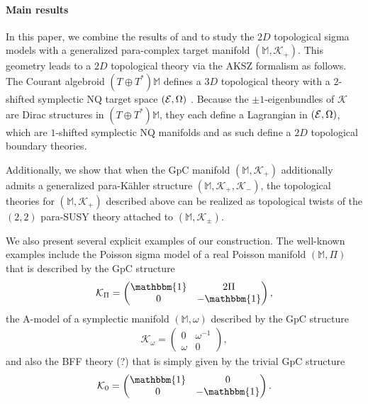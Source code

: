 \documentclass{article}
\newcommand{\TT}{{T\oplus T^*}}
\newcommand{\KK}{\mathcal{K}}
\newcommand{\id}{\mathbbm{1}}
\newcommand{\Mb}{\mathbb{M}}
\theoremstyle{definition}
\theoremstyle{remark}
\begin{document}
\paragraph{Main results} In this paper, we combine the results of \cite{HullTwistedSUSY} and \cite{Hu:2019zro} to study the $2D$ topological sigma models with a generalized para-complex target manifold $(\Mb,\KK_+)$. This geometry leads to a $2D$ topological theory via the AKSZ formalism as follows. The Courant algebroid $(\TT)\Mb$ defines a $3D$ topological theory with a $2$-shifted symplectic NQ target space $({\cal E},\Omega)$ \cite{Roytenberg:2002nu}. Because the $\pm 1$-eigenbundles of $\KK$ are Dirac structures in $(\TT)\Mb$, they each define a Lagrangian in $({\cal E},\Omega)$, which are $1$-shifted symplectic NQ manifolds and as such define a $2D$ topological boundary theories.

Additionally, we show that when the GpC manifold $(\Mb,\KK_+)$ additionally admits a generalized para-K\"ahler structure $(\Mb,\KK_+,\KK_-)$, the topological theories for $(\Mb,\KK_+)$ described above can be realized as topological twists of the $(2,2)$ para-SUSY theory attached to $(\Mb,\KK_\pm)$.

We also present several explicit examples of our construction. The well-known examples include the Poisson sigma model of a real Poisson manifold $(\Mb,\Pi)$ that is described by the GpC structure
\begin{align*}
\KK_\Pi=
\begin{pmatrix}
\id & 2\Pi \\
0 & -\id
\end{pmatrix},
\end{align*}
the A-model of a symplectic manifold $(\Mb,\omega)$ described by the GpC structure
\begin{align*}
\KK_\omega=
\begin{pmatrix}
0 & \omega^{-1} \\
\omega & 0
\end{pmatrix},
\end{align*}
and also the BFF theory (?) that is simply given by the trivial GpC structure
\begin{align*}
\KK_0=
\begin{pmatrix}
\id & 0 \\
0 & -\id
\end{pmatrix}.
\end{align*}
\end{document}
